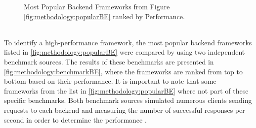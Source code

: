 \begin{figure}[htbp] \ContinuedFloat
  \myfloatalign
   \caption{Most Popular Backend Frameworks from Figure \ref{fig:methodology:popularBE} ranked by Performance.}
   \label{fig:methodology:benchmarkBE}
\end{figure}
~\\
To identify a high-performance framework, the most popular backend frameworks listed in \autoref{fig:methodology:popularBE} were compared by using two independent benchmark sources. The results of these benchmarks are presented in \autoref{fig:methodology:benchmarkBE}, where the frameworks are ranked from top to bottom based on their performance. It is important to note that some frameworks from the list in \autoref{fig:methodology:popularBE} where not part of these specific benchmarks. Both benchmark sources simulated numerous clients sending requests to each backend and measuring the number of successful responses per second in order to determine the performance \cite{backend:benchmark1, backend:benchmark2}.


